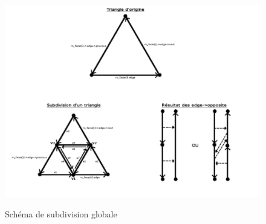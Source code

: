 \documentclass[a4paper]{memoir}
\begin{document}
			\begin{figure}
				\hspace{-3cm}\includegraphics[scale=0.5]{img/subdivide.png}
				\label{fig:subdivide}
				\caption{Schéma de subdivision globale}
			\end{figure}
\end{document}
